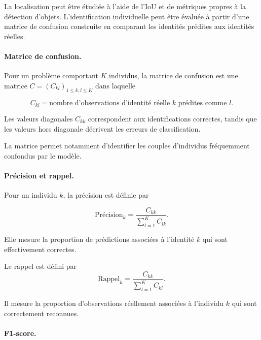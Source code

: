 \documentclass[11pt,a4paper]{report}
\begin{document}
La localisation peut être étudiée à l'aide de l'IoU et de métriques propres à
la détection d'objets. L'identification individuelle peut être évaluée à partir
d'une matrice de confusion construite en comparant les identités prédites aux
identités réelles.

\paragraph{Matrice de confusion.}

Pour un problème comportant $K$ individus, la matrice de confusion est une
matrice $C=(C_{kl})_{1\leq k,l\leq K}$ dans laquelle

\begin{equation}
    C_{kl}
    =
    \text{nombre d'observations d'identité réelle $k$ prédites comme $l$}.
\end{equation}

Les valeurs diagonales $C_{kk}$ correspondent aux identifications correctes,
tandis que les valeurs hors diagonale décrivent les erreurs de classification.

La matrice permet notamment d'identifier les couples d'individus fréquemment
confondus par le modèle.

\paragraph{Précision et rappel.}

Pour un individu $k$, la précision est définie par

\begin{equation}
    \text{Précision}_k
    =
    \frac{C_{kk}}
    {\displaystyle\sum_{l=1}^{K} C_{lk}}.
    \label{eq:precision}
\end{equation}

Elle mesure la proportion de prédictions associées à l'identité $k$ qui sont
effectivement correctes.

Le rappel est défini par
\begin{equation}
    \text{Rappel}_k
    =
    \frac{C_{kk}}
    {\displaystyle\sum_{l=1}^{K} C_{kl}}.
    \label{eq:rappel}
\end{equation}

Il mesure la proportion d'observations réellement associées à l'individu $k$
qui sont correctement reconnues.

\paragraph{F1-score.}
\end{document}
